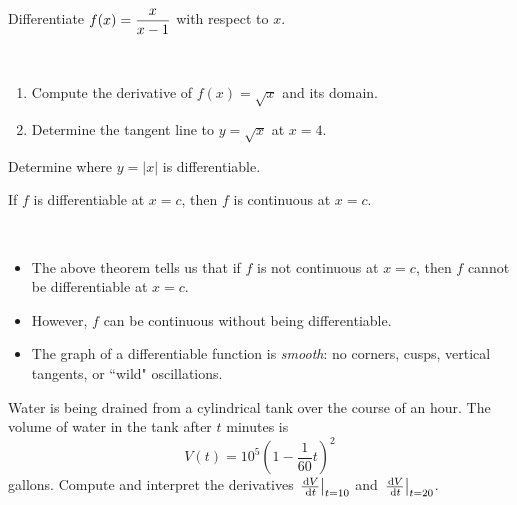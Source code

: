 \begin{example}
Differentiate $\displaystyle f(x) = \frac{x}{x-1}$ with respect to $x$.
\end{example}

\newpage

\begin{example}\,
\begin{enumerate}
\item Compute the derivative of $f(x)=\sqrt x$ and its domain.
\vfill
\item Determine the tangent line to $y=\sqrt x$ at $x=4$.
\vfill
\end{enumerate}
\end{example}

\newpage

\begin{example}
Determine where $y=|x|$ is differentiable.
\end{example}

\newpage

\begin{theorem}
If $f$ is differentiable at $x=c$, then $f$ is continuous at $x=c$.
\end{theorem}
\begin{remark}\,
\begin{itemize}
\item The above theorem tells us that if $f$ is not continuous at $x=c$, then $f$ cannot be differentiable at $x=c$.
\item However, $f$ can be continuous without being differentiable.
\item The graph of a differentiable function is \textit{smooth}: no corners, cusps, vertical tangents, or ``wild" oscillations.
\end{itemize}
\end{remark}

\newpage

\begin{example}
Water is being drained from a cylindrical tank over the course of an hour.
The volume of water in the tank after $t$ minutes is 
\begin{equation*}
V(t) = 10^5\left(1-\frac{1}{60}t\right)^2
\end{equation*}
gallons.  
Compute and interpret the derivatives $\left.\frac{\mkern 2mu \mathrm{d} V}{\mkern 2mu \mathrm{d} t}\right|_{t=10}$ and $\left.\frac{\mkern 2mu \mathrm{d} V}{\mkern 2mu \mathrm{d} t}\right|_{t=20}$.
\end{example}

